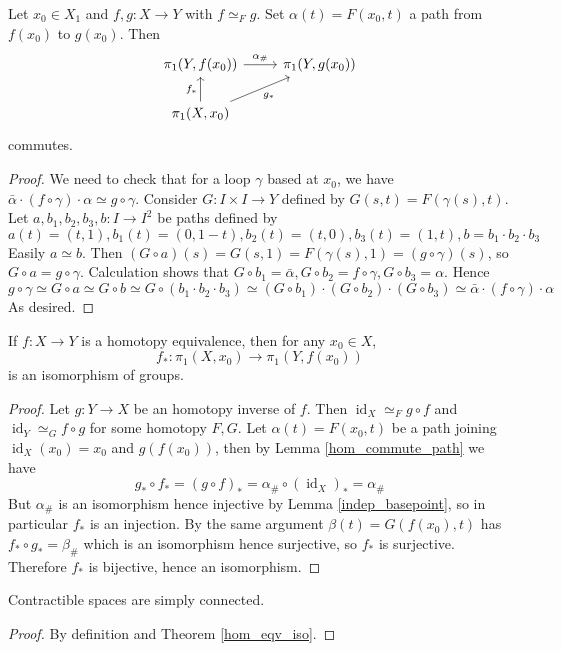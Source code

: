 \begin{lemma}\label{hom_commute_path}
    Let $x_0\in X_1$ and $f,g:X\to Y$ with $f\simeq_Fg$.
    Set $\alpha(t)=F(x_0,t)$ a path from $f(x_0)$ to $g(x_0)$.
    Then
    \[
        \begin{tikzcd}
            \pi_1(Y,f(x_0))\arrow{r}{\alpha_\#}&\pi_1(Y,g(x_0))\\
            \pi_1(X,x_0)\arrow{u}{f_\ast}\arrow[swap]{ur}{g_\ast}&
        \end{tikzcd}
    \]
    commutes.
\end{lemma}
\begin{proof}
    We need to check that for a loop $\gamma$ based at $x_0$, we have $\bar\alpha\cdot(f\circ\gamma)\cdot\alpha\simeq g\circ\gamma$.
    Consider $G:I\times I\to Y$ defined by $G(s,t)=F(\gamma(s),t)$.
    Let $a,b_1,b_2,b_3,b:I\to I^2$ be paths defined by
    $$a(t)=(t,1),b_1(t)=(0,1-t),b_2(t)=(t,0),b_3(t)=(1,t),b=b_1\cdot b_2\cdot b_3$$
    Easily $a\simeq b$.
    Then $(G\circ a)(s)=G(s,1)=F(\gamma(s),1)=(g\circ\gamma)(s)$, so $G\circ a=g\circ\gamma$.
    Calculation shows that $G\circ b_1=\bar\alpha, G\circ b_2=f\circ\gamma, G\circ b_3=\alpha$.
    Hence
    $$g\circ\gamma\simeq G\circ a\simeq G\circ b\simeq G\circ (b_1\cdot b_2\cdot b_3)\simeq (G\circ b_1)\cdot(G\circ b_2)\cdot(G\circ b_3)\simeq \bar\alpha\cdot(f\circ\gamma)\cdot\alpha$$
    As desired.
\end{proof}
\begin{theorem}\label{hom_eqv_iso}
    If $f:X\to Y$ is a homotopy equivalence, then for any $x_0\in X$,
    $$f_\ast:\pi_1(X,x_0)\to\pi_1(Y,f(x_0))$$
    is an isomorphism of groups.
\end{theorem}
\begin{proof}
    Let $g:Y\to X$ be an homotopy inverse of $f$.
    Then $\operatorname{id}_X\simeq_Fg\circ f$ and $\operatorname{id}_Y\simeq_Gf\circ g$ for some homotopy $F,G$.
    Let $\alpha(t)=F(x_0,t)$ be a path joining $\operatorname{id}_X(x_0)=x_0$ and $g(f(x_0))$, then by Lemma \ref{hom_commute_path} we have
    $$g_\ast\circ f_\ast=(g\circ f)_\ast=\alpha_\#\circ (\operatorname{id}_X)_\ast=\alpha_\#$$
    But $\alpha_\#$ is an isomorphism hence injective by Lemma \ref{indep_basepoint}, so in particular $f_\ast$ is an injection.
    By the same argument $\beta(t)=G(f(x_0),t)$ has $f_\ast\circ g_\ast=\beta_\#$ which is an isomorphism hence surjective, so $f_\ast$ is surjective.
    Therefore $f_\ast$ is bijective, hence an isomorphism.
\end{proof}
\begin{corollary}
    Contractible spaces are simply connected.
\end{corollary}
\begin{proof}
    By definition and Theorem \ref{hom_eqv_iso}.
\end{proof}